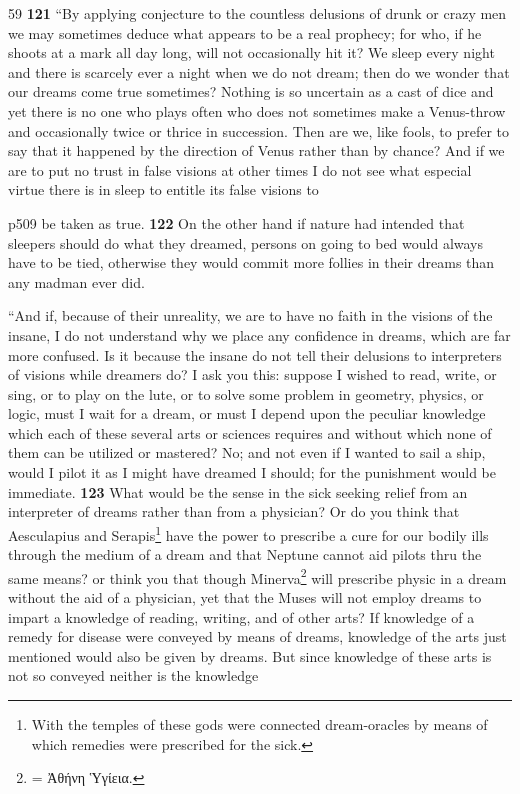 59
\textbf{121} ``By applying conjecture to the countless delusions of drunk or crazy men we may sometimes deduce what appears to be a real prophecy; for who, if he shoots at a mark all day long, will not occasionally hit it? We sleep every night and there is scarcely ever a night when we do not dream; then do we wonder that our dreams come true sometimes? Nothing is so uncertain as a cast of dice and yet there is no one who plays often who does not sometimes make a Venus-throw and occasionally twice or thrice in succession. Then are we, like fools, to prefer to say that it happened by the direction of Venus rather than by chance? And if we are to put no trust in false visions at other times I do not see what especial virtue there is in sleep to entitle its false visions to

p509 be taken as true. \textbf{122} On the other hand if nature had intended that sleepers should do what they dreamed, persons on going to bed would always have to be tied, otherwise they would commit more follies in their dreams than any madman ever did.

``And if, because of their unreality, we are to have no faith in the visions of the insane, I do not understand why we place any confidence in dreams, which are far more confused. Is it because the insane do not tell their delusions to interpreters of visions while dreamers do? I ask you this: suppose I wished to read, write, or sing, or to play on the lute, or to solve some problem in geometry, physics, or logic, must I wait for a dream, or must I depend upon the peculiar knowledge which each of these several arts or sciences requires and without which none of them can be utilized or mastered? No; and not even if I wanted to sail a ship, would I pilot it as I might have dreamed I should; for the punishment would be immediate. \textbf{123} What would be the sense in the sick seeking relief from an interpreter of dreams rather than from a physician? Or do you think that Aesculapius and Serapis\texthebrew{}\footnote{With the temples of these gods were connected dream-oracles by means of which remedies were prescribed for the sick.

} have the power to prescribe a cure for our bodily ills through the medium of a dream and that Neptune cannot aid pilots thru the same means? or think you that though Minerva\texthebrew{}\footnote{= \textgreek{\texthebrew{Ἀ}θήνη \texthebrew{Ὑ}γίεια.}} will prescribe physic in a dream without the aid of a physician, yet that the Muses will not employ dreams to impart a knowledge of reading, writing, and of other arts? If knowledge of a remedy for disease were conveyed by means of dreams, knowledge of the arts just mentioned would also be given by dreams. But since knowledge of these arts is not so conveyed neither is the knowledge


